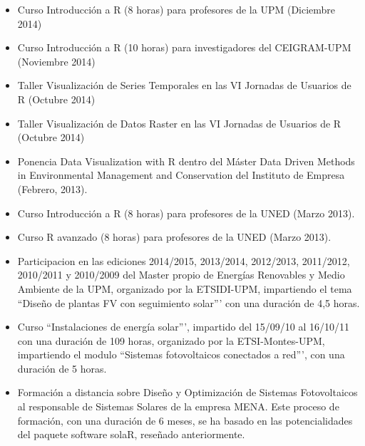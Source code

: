 \documentclass[article, a4paper]{memoir}
\begin{document}
\begin{itemize}
\item Curso \guillemotleft{}Introducción a R\guillemotright{} (8 horas) para profesores de la UPM (Diciembre 2014)

\item Curso \guillemotleft{}Introducción a R\guillemotright{} (10 horas) para investigadores del CEIGRAM-UPM (Noviembre 2014)

\item Taller \guillemotleft{}Visualización de Series Temporales\guillemotright{} en las VI Jornadas de Usuarios de R (Octubre 2014)

\item Taller \guillemotleft{}Visualización de Datos Raster\guillemotright{} en las VI Jornadas de Usuarios de R (Octubre 2014)

\item Ponencia \guillemotleft{}Data Visualization with R\guillemotright{} dentro del Máster \guillemotleft{}Data Driven Methods in Environmental Management and Conservation\guillemotright{} del Instituto
de Empresa (Febrero, 2013).

\item Curso \guillemotleft{}Introducción a R\guillemotright{} (8 horas) para profesores de la UNED (Marzo 2013).

\item Curso \guillemotleft{}R avanzado\guillemotright{} (8 horas) para profesores de la UNED (Marzo 2013).

\item Participacion en las ediciones 2014/2015, 2013/2014, 2012/2013, 2011/2012, 2010/2011 y 2010/2009 del Master propio de Energías Renovables y Medio Ambiente de la UPM, organizado por la ETSIDI-UPM, impartiendo el tema ``Diseño de plantas FV con seguimiento solar''' con una duración de 4,5 horas.

\item Curso ``Instalaciones de energía solar''', impartido del 15/09/10 al 16/10/11 con una duración de 109 horas, organizado por la ETSI-Montes-UPM, impartiendo el modulo ``Sistemas fotovoltaicos conectados a red''', con una duración de 5 horas.

\item Formación a distancia sobre Diseño y Optimización de Sistemas Fotovoltaicos al responsable de Sistemas Solares de la empresa MENA. Este proceso de formación, con una duración de 6 meses, se ha basado en las potencialidades del paquete software solaR, reseñado anteriormente.


\end{itemize}
\end{document}
